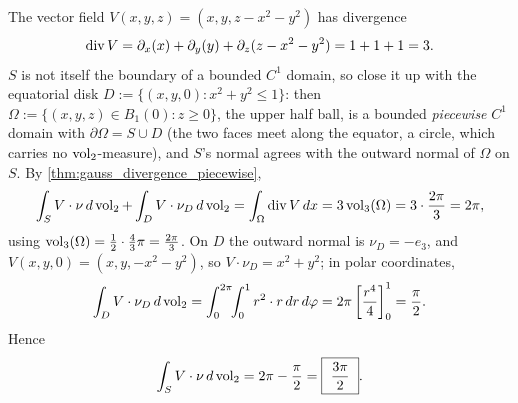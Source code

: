 \begin{exercisesolution}
\label{sol:vector_field_flux_hemisphere}
The vector field $V(x,y,z) = (x,y,z-x^2-y^2)$ has divergence
\[\operatorname{div} V = \partial_x(x) + \partial_y(y) + \partial_z(z-x^2-y^2) = 1+1+1 = 3.\]
$S$ is not itself the boundary of a bounded $C^1$ domain, so close it up with the equatorial
disk $D := \{(x,y,0) : x^2+y^2\leq1\}$: then $\Omega := \{(x,y,z)\in B_1(0) : z\geq0\}$, the
upper half ball, is a bounded \emph{piecewise} $C^1$ domain with $\partial\Omega = S\cup D$ (the
two faces meet along the equator, a circle, which carries no $\operatorname{vol}_2$-measure), and $S$'s
 normal agrees with the outward normal of $\Omega$ on $S$. By
\cref{thm:gauss_divergence_piecewise},
\[\int_S V\cdot\nu\,d\operatorname{vol}_2 + \int_D V\cdot\nu_D\,d\operatorname{vol}_2 = \int_\Omega \operatorname{div} V\,dx
  = 3\operatorname{vol}_3(\Omega) = 3\cdot\frac{2\pi}{3} = 2\pi,\]
using $\operatorname{vol}_3(\Omega) = \frac12\cdot\frac43\pi = \frac{2\pi}{3}$. On $D$ the outward normal is
$\nu_D = -e_3$, and $V(x,y,0) = (x,y,-x^2-y^2)$, so $V\cdot\nu_D = x^2+y^2$; in polar
coordinates,
\[\int_D V\cdot\nu_D\,d\operatorname{vol}_2 = \int_0^{2\pi}\!\!\int_0^1 r^2\cdot r\,dr\,d\varphi
  = 2\pi\left[\frac{r^4}{4}\right]_0^1 = \frac{\pi}{2}.\]
Hence
\[\int_S V\cdot\nu\,d\operatorname{vol}_2 = 2\pi - \frac{\pi}{2} = \boxed{\ \frac{3\pi}{2}\ }.\]
\end{exercisesolution}

